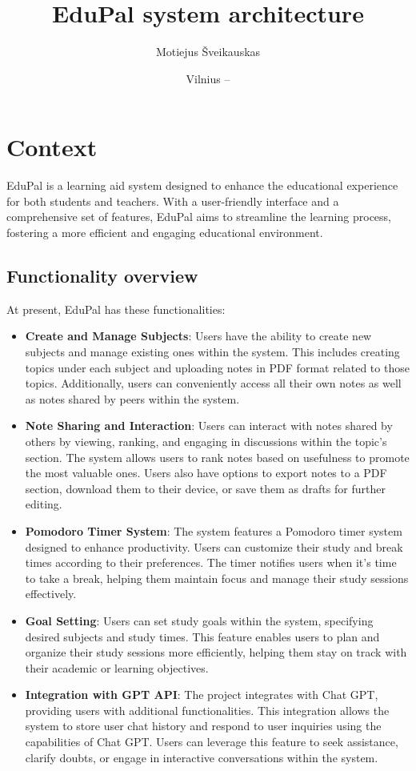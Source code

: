 \documentclass[
    english, %
]{VUMIFPSkursinis}
\title{EduPal system architecture}
\author{Motiejus Šveikauskas}
\date{Vilnius – \the\year}
\begin{document}
\maketitle

\tableofcontents

\section{Context}
EduPal is a learning aid system designed to enhance
the educational experience for both students and teachers. With a user-friendly interface and a comprehensive set of features, EduPal aims to streamline the learning process, fostering a more efficient and engaging educational environment.

\subsection{Functionality overview}

At present, EduPal has these functionalities:

\begin{itemize}
    \item \textbf{Create and Manage Subjects}: Users have the ability to create new subjects and manage existing ones within the system. This includes creating topics under each subject and uploading notes in PDF format related to those topics. Additionally, users can conveniently access all their own notes as well as notes shared by peers within the system.
    \item \textbf{Note Sharing and Interaction}: Users can interact with notes shared by others by viewing, ranking, and engaging in discussions within the topic's section. The system allows users to rank notes based on usefulness to promote the most valuable ones. Users also have options to export notes to a PDF section, download them to their device, or save them as drafts for further editing. 
    \item \textbf{Pomodoro Timer System}: The system features a Pomodoro timer system designed to enhance productivity. Users can customize their study and break times according to their preferences. The timer notifies users when it's time to take a break, helping them maintain focus and manage their study sessions effectively.
    \item \textbf{Goal Setting}: Users can set study goals within the system, specifying desired subjects and study times. This feature enables users to plan and organize their study sessions more efficiently, helping them stay on track with their academic or learning objectives.
    \item \textbf{Integration with GPT API}: The project integrates with Chat GPT, providing users with additional functionalities. This integration allows the system to store user chat history and respond to user inquiries using the capabilities of Chat GPT. Users can leverage this feature to seek assistance, clarify doubts, or engage in interactive conversations within the system.
    \end{itemize}
\end{document}
